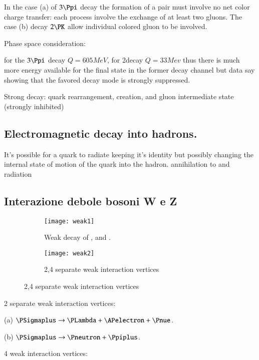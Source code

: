 \documentclass[main.tex]{subfiles}
\begin{document}
In the case (a) of $3\Ppi$ decay the formation of a \Pq\Paq pair must involve no net color charge transfer: each process involve the exchange of at least two gluons. The case (b) decay $2\PK$ allow individual colored gluon to be involved.

Phase space consideration:

for the $3\Ppi$ decay $Q=605 MeV$, for 2\PK decay $Q=33 Mev$ thus there is much more energy available for the final state in the former decay channel but data say   showing that the favored decay mode is strongly suppressed.

Strong decay: quark rearrangement, \Pq\Paq creation, and gluon intermediate state (strongly inhibited)

\subsection{Electromagnetic decay into hadrons.}

It's possible for a quark to radiate \Pphoton keeping it's identity but possibly changing the internal state of motion of the quark into the hadron.
\Pq\Paq annihilation to \Pphoton and radiation

\subsection{Interazione debole bosoni W e Z}

\begin{figure}[!ht]
\centering
\begin{subfigure}[b]{0.4\textwidth}
\texttt{[image: weak1]}
\caption{Weak decay of \Pneutron, \Ppiplus and \PSigma.
}
\label{fig:weak1}
\end{subfigure}
\hfill
\begin{subfigure}[b]{0.4\textwidth}
\texttt{[image: weak2]}
\caption{2,4 separate weak interaction vertices}

\label{fig:weak2}
\end{subfigure}
\end{figure}

2 separate weak interaction vertices:

(a) $\PSigmaplus\rightarrow\PLambda+\APelectron+\Pnue$.

(b) $\PSigmaplus\rightarrow\Pneutron+\Ppiplus$.

4 weak interaction vertices:
\end{document}

